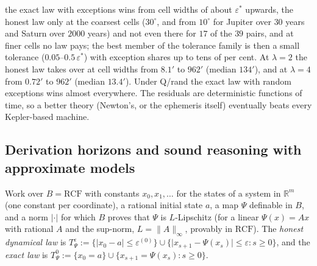 the exact law with exceptions wins from cell widths of about $\varepsilon^*$ upwards, the honest law only at the coarsest cells ($30^\circ$, and from $10^\circ$ for Jupiter over $30$ years and Saturn over $2000$ years) and not even there for $17$ of the $39$ pairs, and at finer cells no law pays; the best member of the tolerance family is then a small tolerance ($0.05$--$0.5\,\varepsilon^*$) with exception shares up to tens of per cent. At $\lambda=2$ the honest law takes over at cell widths from $8.1'$ to $962'$ (median $134'$), and at $\lambda=4$ from $0.72'$ to $962'$ (median $13.4'$). Under Q/rand the exact law with random exceptions wins almost everywhere. The residuals are deterministic functions of time, so a better theory (Newton's, or the ephemeris itself) eventually beats every Kepler-based machine.

\subsection{Derivation horizons and sound reasoning with approximate models}\label{app:laws:sound}

Work over $B=\mathrm{RCF}$ with constants $x_0,x_1,\dots$ for the states of a system in $\mathbb R^m$ (one constant per coordinate), a rational initial state $a$, a map $\Psi$ definable in $B$, and a norm $\lvert\cdot\rvert$ for which $B$ proves that $\Psi$ is $L$-Lipschitz (for a linear $\Psi(x)=Ax$ with rational $A$ and the sup-norm, $L=\lVert A\rVert_\infty$, provably in $\mathrm{RCF}$). The \emph{honest dynamical law} is $T^\varepsilon_\Psi:=\{\lvert x_0-a\rvert\le\varepsilon^{(0)}\}\cup\{\lvert x_{s+1}-\Psi(x_s)\rvert\le\varepsilon:s\ge0\}$, and the \emph{exact law} is $T^0_\Psi:=\{x_0=a\}\cup\{x_{s+1}=\Psi(x_s):s\ge0\}$.

